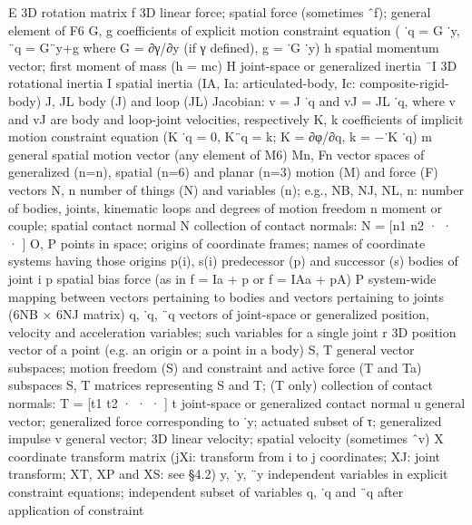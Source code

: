 E 3D rotation matrix f 3D linear force; spatial force (sometimes ˆf); general element of F6 G, g coefficients of explicit motion constraint equation ( ˙q = G ˙y, ¨q = G¨y+g where G = ∂γ/∂y (if γ defined), g = ˙G ˙y) h spatial momentum vector; first moment of mass (h = mc) H joint-space or generalized inertia ¯I 3D rotational inertia I spatial inertia (IA, Ia: articulated-body, Ic: composite-rigid-body) J, JL body (J) and loop (JL) Jacobian: v = J ˙q and vJ = JL ˙q, where v and vJ are body and loop-joint velocities, respectively K, k coefficients of implicit motion constraint equation (K ˙q = 0, K¨q = k; K = ∂φ/∂q, k = −˙K ˙q) m general spatial motion vector (any element of M6) Mn, Fn vector spaces of generalized (n=n), spatial (n=6) and planar (n=3) motion (M) and force (F) vectors N, n number of things (N) and variables (n); e.g., NB, NJ, NL, n: number of bodies, joints, kinematic loops and degrees of motion freedom n moment or couple; spatial contact normal N collection of contact normals: N = [n1 n2 · · · ] O, P points in space; origins of coordinate frames; names of coordinate systems having those origins p(i), s(i) predecessor (p) and successor (s) bodies of joint i p spatial bias force (as in f = Ia + p or f = IAa + pA) P system-wide mapping between vectors pertaining to bodies and vectors pertaining to joints (6NB × 6NJ matrix) q, ˙q, ¨q vectors of joint-space or generalized position, velocity and acceleration variables; such variables for a single joint r 3D position vector of a point (e.g. an origin or a point in a body) S, T general vector subspaces; motion freedom (S) and constraint and active force (T and Ta) subspaces S, T matrices representing S and T; (T only) collection of contact normals: T = [t1 t2 · · · ] t joint-space or generalized contact normal u general vector; generalized force corresponding to ˙y; actuated subset of τ; generalized impulse v general vector; 3D linear velocity; spatial velocity (sometimes ˆv) X coordinate transform matrix (jXi: transform from i to j coordinates; XJ: joint transform; XT, XP and XS: see §4.2) y, ˙y, ¨y independent variables in explicit constraint equations; independent subset of variables q, ˙q and ¨q after application of constraint
